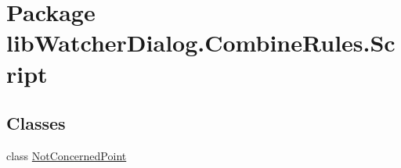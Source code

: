 \hypertarget{namespacelib_watcher_dialog_1_1_combine_rules_1_1_script}{\section{Package lib\+Watcher\+Dialog.\+Combine\+Rules.\+Script}
\label{namespacelib_watcher_dialog_1_1_combine_rules_1_1_script}
}
\subsection*{Classes}
\begin{DoxyCompactItemize}
\item 
class \hyperlink{classlib_watcher_dialog_1_1_combine_rules_1_1_script_1_1_not_concerned_point}{Not\+Concerned\+Point}
\end{DoxyCompactItemize}
